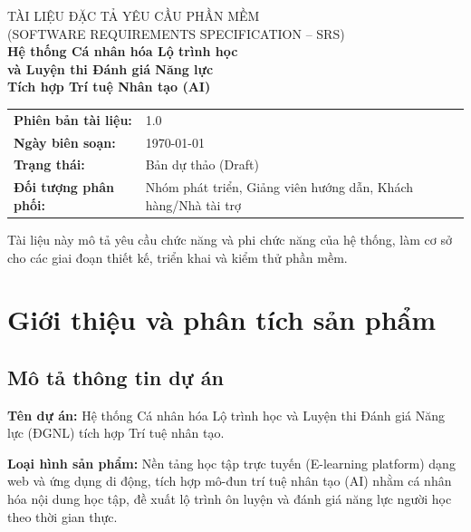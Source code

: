 \documentclass[12pt,a4paper]{article}
\begin{document}
	
	\begin{titlepage}
		\centering
		\vspace*{1.5cm}
		{\large TÀI LIỆU ĐẶC TẢ YÊU CẦU PHẦN MỀM}\\[0.3cm]
		{\large (SOFTWARE REQUIREMENTS SPECIFICATION -- SRS)}\\[2cm]
		
		{\Huge\bfseries Hệ thống Cá nhân hóa Lộ trình học\\[0.4cm] và Luyện thi Đánh giá Năng lực\\[0.4cm] Tích hợp Trí tuệ Nhân tạo (AI)}\\[2.5cm]
		
		\begin{tabular}{ll}
			\textbf{Phiên bản tài liệu:} & 1.0 \\
			\textbf{Ngày biên soạn:} & \today \\
			\textbf{Trạng thái:} & Bản dự thảo (Draft) \\
			\textbf{Đối tượng phân phối:} & Nhóm phát triển, Giảng viên hướng dẫn, Khách hàng/Nhà tài trợ \\
		\end{tabular}
		
		\vfill
		{\small Tài liệu này mô tả yêu cầu chức năng và phi chức năng của hệ thống, làm cơ sở\\
			cho các giai đoạn thiết kế, triển khai và kiểm thử phần mềm.}
	\end{titlepage}
	
	\tableofcontents
	\newpage
	
	\section{Giới thiệu và phân tích sản phẩm}
	
	\subsection{Mô tả thông tin dự án}
	
	\textbf{Tên dự án:} Hệ thống Cá nhân hóa Lộ trình học và Luyện thi Đánh giá Năng lực (ĐGNL) tích hợp Trí tuệ nhân tạo.
	
	\textbf{Loại hình sản phẩm:} Nền tảng học tập trực tuyến (E-learning platform) dạng web và ứng dụng di động, tích hợp mô-đun trí tuệ nhân tạo (AI) nhằm cá nhân hóa nội dung học tập, đề xuất lộ trình ôn luyện và đánh giá năng lực người học theo thời gian thực.
	
\end{document}
